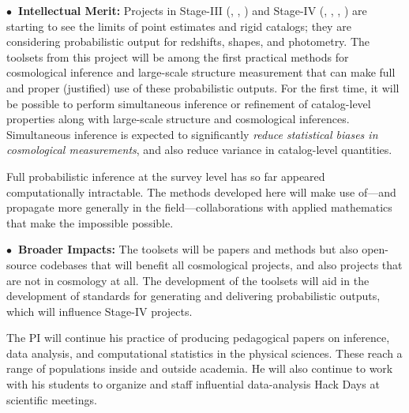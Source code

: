 \documentclass[12pt]{article}
\begin{document}
\smallskip\noindent
\textbf{$\bullet$~Intellectual Merit:}
Projects in Stage-III (\eg, \boss, \des)
and Stage-IV (\eg, \lsst, \euclid, \wfirst)
are starting to see the limits of point estimates and rigid catalogs;
they are considering probabilistic output for redshifts,
shapes, and photometry.
The toolsets from this project will be among the first practical methods for
cosmological inference and large-scale structure measurement that can
make full and proper (justified) use of these probabilistic outputs.
For the first time, it will be possible to perform
simultaneous inference or refinement of catalog-level properties along with
large-scale structure and cosmological inferences.
Simultaneous inference is expected to significantly \emph{reduce statistical
biases in cosmological measurements},
and also reduce variance in catalog-level quantities.

Full probabilistic inference at the survey level has so far appeared
computationally intractable.
The methods developed here will make use of---and propagate more
generally in the field---collaborations with applied mathematics that
make the impossible possible.

\smallskip\noindent
\textbf{$\bullet$~Broader Impacts:}
The toolsets will be papers and methods but also open-source codebases
that will benefit all cosmological projects, and also projects that
are not in cosmology at all.
The development of the toolsets will aid in the development of
standards for generating and delivering probabilistic outputs, which
will influence Stage-IV projects.

The PI will continue his practice of producing pedagogical papers on
inference, data analysis, and computational statistics in the physical
sciences.
These reach a range of populations inside and outside academia.
He will also continue to work with his students to organize and staff
influential data-analysis Hack Days at scientific meetings.
\end{document}
